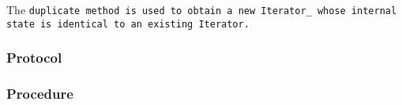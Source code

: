 \def\Subsubsection#1{\subsubsection{#1}
}

The \tt{duplicate} method is used to obtain a new \tt{Iterator_}
whose internal state is identical to an existing \tt{Iterator}.

\Subsubsection{Protocol}

\Subsubsection{Procedure}

